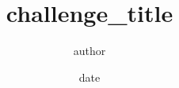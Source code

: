 \documentclass{article}
\begin{document}
\title{{{challenge_title}}}
\author{{{author}}}
\date{{{date}}}
\maketitle

\end{document}
